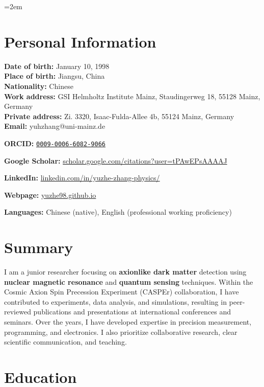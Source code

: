 \begingroup
\emergencystretch=2em
\section*{Personal Information}

\noindent\textbf{Date of birth:} January 10, 1998 \\
\noindent\textbf{Place of birth:} Jiangsu, China \\
\textbf{Nationality:} Chinese \\
\textbf{Work address:} GSI Helmholtz Institute Mainz, Staudingerweg 18, 55128 Mainz, Germany \\
\textbf{Private address:} Zi. 3320, Isaac-Fulda-Allee 4b, 55124 Mainz, Germany \\
\textbf{Email:} yuhzhang@uni-mainz.de

\noindent\textbf{ORCID:} \href{https://orcid.org/0009-0006-6082-9066}{\texttt{0009-0006-6082-9066}}

\noindent\textbf{Google Scholar:} \href{https://scholar.google.com/citations?user=tPAwEPsAAAAJ&hl=en&oi=sra}{scholar.google.com/citations?user=tPAwEPsAAAAJ}

\noindent\textbf{LinkedIn:} \href{https://www.linkedin.com/in/yuzhe-zhang-physics/}{linkedin.com/in/yuzhe-zhang-physics/}

\noindent\textbf{Webpage:} \href{https://yuzhe98.github.io/}{yuzhe98.github.io}

\noindent\textbf{Languages:} Chinese (native), English (professional working proficiency)

\section*{Summary}
I am a junior researcher focusing on \textbf{axionlike dark matter} detection using \textbf{nuclear magnetic resonance} and \textbf{quantum sensing} techniques. 
Within the Cosmic Axion Spin Precession Experiment (CASPEr) collaboration, I have contributed to experiments, data analysis, and simulations, resulting in peer-reviewed publications and presentations at international conferences and seminars. 
Over the years, I have developed expertise in precision measurement, programming, and electronics. 
I also prioritize collaborative research, clear scientific communication, and teaching.

\section*{Education}

